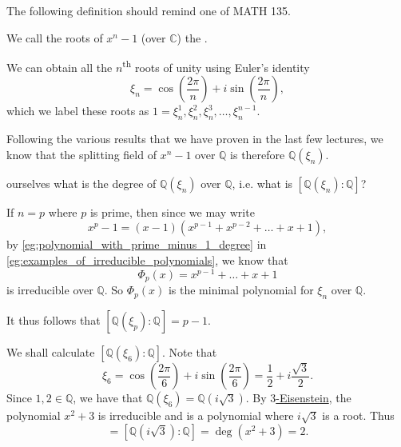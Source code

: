 \documentclass[notoc,notitlepage]{tufte-book}
\begin{document}
The following definition should remind one of MATH 135.

\begin{defn}\label{defn:_n_th_roots_of_unity}
  We call the roots of $x^n - 1$ (over $\mathbb{C}$) the .
\end{defn}

\begin{eg}
  We can obtain all the $n$\textsuperscript{th} roots of unity using Euler's identity
  \begin{equation*}
    \xi_n = \cos \left( \frac{2\pi}{n} \right) + i \sin \left( \frac{2 \pi}{n} \right),
  \end{equation*}
  which we label these roots as $1 = \xi_n^1, \xi_n^2, \xi_n^3, \ldots, \xi_n^{n - 1}$.
\end{eg}

Following the various results that we have proven in the last few lectures, we know that
the splitting field of $x^n - 1$ over $\mathbb{Q}$ is therefore $\mathbb{Q}(\xi_n)$.

 ourselves what is the degree of $\mathbb{Q}(\xi_n)$ over
$\mathbb{Q}$, i.e. what is $[ \mathbb{Q}(\xi_n) : \mathbb{Q} ]$?

If $n = p$ where $p$ is prime, then since we may write
\begin{equation*}
  x^p - 1 = (x - 1)(x^{p - 1} + x^{p - 2} + \hdots + x + 1),
\end{equation*}
by \cref{eg:polynomial_with_prime_minus_1_degree} in
\cref{eg:examples_of_irreducible_polynomials}, we know that
\begin{equation*}
  \Phi_p(x) = x^{p - 1} + \hdots + x + 1
\end{equation*}
is irreducible over $\mathbb{Q}$. So $\Phi_p(x)$ is the minimal polynomial for $\xi_n$
over $\mathbb{Q}$.

It thus follows that $[ \mathbb{Q}(\xi_p) : \mathbb{Q} ] = p - 1$.

\begin{eg}
  We shall calculate $[ \mathbb{Q}(\xi_6) : \mathbb{Q} ]$. Note that
  \begin{equation*}
    \xi_6 = \cos \left( \frac{2 \pi}{6} \right) + i \sin \left( \frac{2 \pi}{6} \right) =
    \frac{1}{2} + i \frac{\sqrt{3}}{2}.
  \end{equation*}
  Since $1, 2 \in \mathbb{Q}$, we have that $\mathbb{Q}(\xi_6) = \mathbb{Q}(i \sqrt{3})$.
  By \hyperref[propo:eisenstein_s_criterion]{$3$-Eisenstein}, the polynomial $x^2 + 3$ is
  irreducible and is a polynomial where $i \sqrt{3}$ is a root. Thus
  \begin{equation*}
    [ \mathbb{Q}(\xi_6) : \mathbb{Q} ] = [ \mathbb{Q}(i \sqrt{3}) : \mathbb{Q} ] = \deg
      (x^2 + 3) = 2.
  \end{equation*}
\end{eg}
\end{document}
